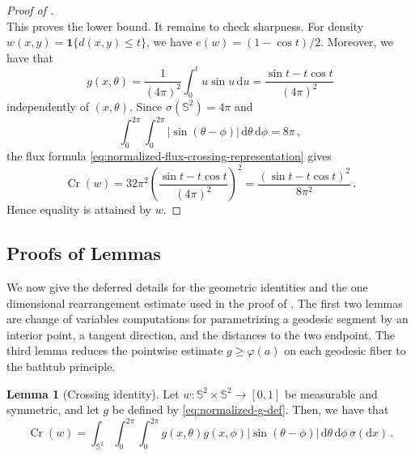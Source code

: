 \documentclass[reqno, 11pt]{amsart}
\theoremstyle{definition}
\newtheorem{lemma}{Lemma}
\newcommand{\abs}[1]{\left\lvert#1\right\rvert}
\newcommand{\dd}{\mathrm{d}}
\newcommand{\II}[1]{\mathbf{1}{#1}}
\begin{document}
\begin{proof}[Proof of ]
\[\]
This proves the lower bound. It remains to check sharpness.  For density \(w(x,y)=\II{\{d(x,y)\le t\}}\), we have \(e(w)=(1-\cos t)/2\).  Moreover, we have that
\[
        g(x,\theta)
        =
        \frac1{(4\pi)^2}\int_0^t u\sin u\,\dd u
        =
        \frac{\sin t-t\cos t}{(4\pi)^2}
\]
independently of \((x,\theta)\).  Since $\sigma({\mathbb S}^2)=4\pi$ and 
\[
        \int_0^{2\pi}\int_0^{2\pi}\abs{\sin(\theta-\phi)}\,\dd\theta\,\dd\phi=8\pi\,,
\]
the flux formula \eqref{eq:normalized-flux-crossing-representation} gives
\[
        \operatorname{Cr}(w)
        =32\pi^2
        \left(\frac{\sin t-t\cos t}{(4\pi)^2}\right)^2
        =
        \frac{(\sin t-t\cos t)^2}{8\pi^2}\,.
\]
Hence equality is attained by \(w\).
\end{proof}

\subsection{Proofs of Lemmas}\label{subsec:main-lemmas}
We now give the deferred details for the geometric identities and the one dimensional rearrangement estimate used in the proof of .  The first two lemmas are change of variables computations for parametrizing a geodesic segment by an interior point, a tangent direction, and the distances to the two endpoint.  The third lemma reduces the pointwise estimate \(g\ge \varphi(a)\) on each geodesic fiber to the bathtub principle.  

\begin{lemma}[Crossing identity]\label{lem:spherical-crossing-jacobian-main}
Let \(w:{\mathbb S}^2\times{\mathbb S}^2\to[0,1]\) be measurable and symmetric, and let \(g\) be defined by \eqref{eq:normalized-g-def}.  Then, we have that
\begin{equation*}
        \operatorname{Cr}(w)=
        \int_{{\mathbb S}^2}\int_0^{2\pi}\int_0^{2\pi}
        g(x,\theta)g(x,\phi)\abs{\sin(\theta-\phi)}
        \,\dd\theta\,\dd\phi\,\sigma(\dd x)\,.
\end{equation*}
\end{lemma}
\end{document}
